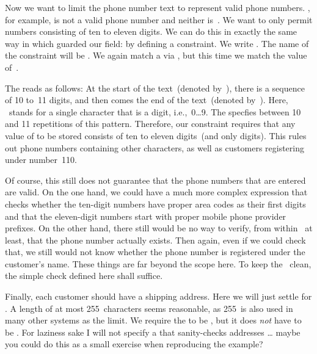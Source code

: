 Now we want to limit the phone number text to represent valid phone numbers.
, for example, is not a valid phone number and neither is~.
We want to only permit numbers consisting of ten to eleven digits.
We can do this in exactly the same way in which guarded our  field:
by defining a constraint.
We write \sqlIdx{\$}\sqlIdx{\textasciicircum}\sqlIdx{\textasciitilde}.
The name of the constraint will be .
We again match a  via \sqlIdx{\textasciitilde}\sqlil{\~}, but this time we match the value of~.

The  \sqlIdx{\$}\sqlIdx{\textasciicircum} reads as follows:
At the start of the text~(denoted by~\textil{\^}\sqlIdx{\textasciicircum}), there is a sequence of 10 to~11 digits, and then comes the end of the text~(denoted by~\textil{\$}\sqlIdx{\$}).
Here, \textil{\\d}\ stands for a single character that is a digit, i.e.,~0\dots9.
The  specfies between 10 and 11 repetitions of this pattern.
Therefore, our constraint requires that any value of  to be stored consists of ten to eleven digits~(and only digits).
This rules out phone numbers containing other characters, as well as customers registering under number~110.

Of course, this still does not guarantee that the phone numbers that are entered are valid.
On the one hand, we could have a much more complex expression that checks whether the ten-digit numbers have proper area codes as their first digits and that the eleven-digit numbers start with proper mobile phone provider prefixes.
On the other hand, there still would be no way to verify, from within \sql\ at least, that the phone number actually exists.
Then again, even if we could check that, we still would not know whether the phone number is registered under the customer's name.
These things are far beyond the scope here.
To keep the \db\ clean, the simple check defined here shall suffice.

Finally, each customer should have a shipping address.
Here we will just settle for .
A length of at most 255~characters seems reasonable, as 255~is also used in many other systems as the limit.
We require the  to be , but it does \emph{not} have to be .
For laziness sake I will not specify a  that sanity-checks addresses {\dots} maybe you could do this as a small exercise when reproducing the example?

